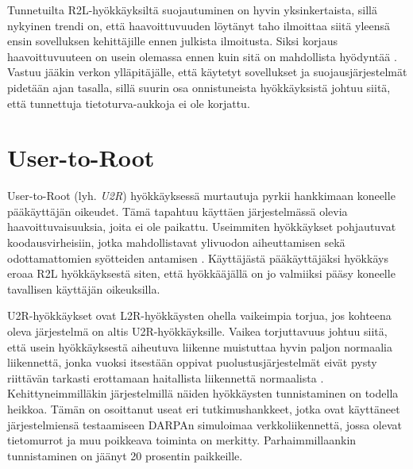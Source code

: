 \documentclass[a4paper,12pt]{article}
\begin{document}
Tunnetuilta R2L-hyökkäyksiltä suojautuminen on hyvin yksinkertaista, sillä
nykyinen trendi on, että haavoittuvuuden löytänyt taho ilmoittaa siitä
yleensä ensin
sovelluksen kehittäjille ennen julkista ilmoitusta. Siksi korjaus
haavoittuvuuteen on usein olemassa ennen kuin sitä on mahdollista hyödyntää \cite{IDSb}.
Vastuu jääkin verkon ylläpitäjälle, että käytetyt sovellukset ja 
suojausjärjestelmät pidetään ajan tasalla, sillä suurin osa onnistuneista hyökkäyksistä 
johtuu siitä, että tunnettuja tietoturva-aukkoja ei ole korjattu.

\section{User-to-Root}

User-to-Root (lyh. \textit{U2R}) hyökkäyksessä murtautuja pyrkii hankkimaan
koneelle pääkäyttäjän oikeudet. Tämä tapahtuu käyttäen järjestelmässä
olevia haavoittuvaisuuksia, joita ei ole paikattu. Useimmiten
hyökkäykset pohjautuvat koodausvirheisiin, jotka mahdollistavat
ylivuodon aiheuttamisen sekä odottamattomien syötteiden antamisen
\cite{IDS}. Käyttäjästä pääkäyttäjäksi hyökkäys eroaa R2L hyökkäyksestä
siten, että hyökkääjällä on jo valmiiksi pääsy koneelle tavallisen
käyttäjän oikeuksilla.

U2R-hyökkäykset ovat L2R-hyökkäysten ohella vaikeimpia torjua, jos kohteena
oleva järjestelmä on altis U2R-hyökkäyksille. Vaikea torjuttavuus johtuu siitä, että
usein hyökkäyksestä aiheutuva liikenne muistuttaa hyvin paljon normaalia
liikennettä, jonka vuoksi itsestään oppivat puolustusjärjestelmät eivät pysty
riittävän tarkasti erottamaan haitallista liikennettä normaalista \cite{U2R}.
Kehittyneimmilläkin järjestelmillä näiden hyökkäysten tunnistaminen on todella
heikkoa. Tämän on osoittanut useat eri tutkimushankkeet, jotka ovat käyttäneet
järjestelmiensä testaamiseen DARPAn simuloimaa verkkoliikennettä,
jossa olevat tietomurrot ja muu poikkeava toiminta on merkitty.
Parhaimmillaankin tunnistaminen on jäänyt 20 prosentin
paikkeille.



\end{document}
